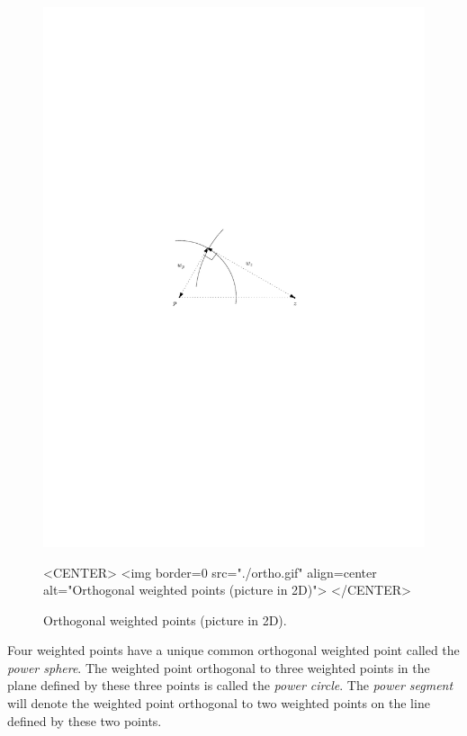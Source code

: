 \begin{figure}[htbp]
\begin{ccTexOnly}
\begin{center} 
\includegraphics{Triangulation_3/ortho} 
\end{center}
\end{ccTexOnly}
\begin{ccHtmlOnly}
<CENTER>
<img border=0 src="./ortho.gif" align=center alt="Orthogonal weighted
points (picture in 2D)"> 
</CENTER>
\end{ccHtmlOnly}
\caption{Orthogonal weighted points (picture in 2D).
\label{Triangulation3-fig-ortho}}
\end{figure} 

Four weighted points have a unique common orthogonal weighted point
called the \textit{power sphere}.  The weighted point orthogonal to
three weighted points in the plane defined by these three points is
called the \textit{power circle}. The
\textit{power segment} will denote the weighted point orthogonal to
two weighted points on the line defined by these two points.


